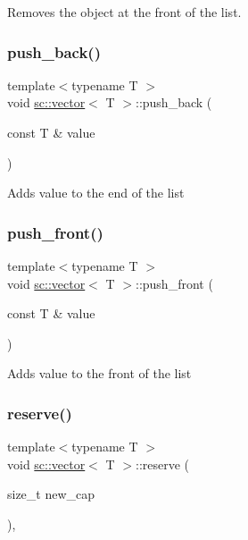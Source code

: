 Removes the object at the front of the list. \mbox{\label{classsc_1_1vector_a5b4a8c72d19d0bdab794e495fb1e334d}} 
\subsubsection{\texorpdfstring{push\+\_\+back()}{push\_back()}}
{\footnotesize\ttfamily template$<$typename T $>$ \\
void \hyperlink{classsc_1_1vector}{sc\+::vector}$<$ T $>$\+::push\+\_\+back (\begin{DoxyParamCaption}\item[{const T \&}]{value }\end{DoxyParamCaption})\hspace{0.3cm}{\ttfamily [inline]}}

Adds value to the end of the list \mbox{\label{classsc_1_1vector_a013daac15aada32590d4372c0cbc610a}} 
\subsubsection{\texorpdfstring{push\+\_\+front()}{push\_front()}}
{\footnotesize\ttfamily template$<$typename T $>$ \\
void \hyperlink{classsc_1_1vector}{sc\+::vector}$<$ T $>$\+::push\+\_\+front (\begin{DoxyParamCaption}\item[{const T \&}]{value }\end{DoxyParamCaption})\hspace{0.3cm}{\ttfamily [inline]}}

Adds value to the front of the list \mbox{\label{classsc_1_1vector_afd98588509a1f15ce5621735f69b01bf}} 
\subsubsection{\texorpdfstring{reserve()}{reserve()}}
{\footnotesize\ttfamily template$<$typename T $>$ \\
void \hyperlink{classsc_1_1vector}{sc\+::vector}$<$ T $>$\+::reserve (\begin{DoxyParamCaption}\item[{size\+\_\+t}]{new\+\_\+cap }\end{DoxyParamCaption})\hspace{0.3cm}{\ttfamily [inline]}, {\ttfamily [private]}}



